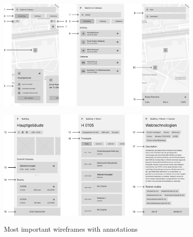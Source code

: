 \begin{figure}[H]
	\centering
	\includegraphics[width=0.9\textwidth]{images/wireframes_1.png}\\
\end{figure}

\begin{figure}[H]
	\centering
	\includegraphics[width=0.9\textwidth]{images/wireframes_2.png}\\
	\caption{Most important wireframes with annotations}
\end{figure}

